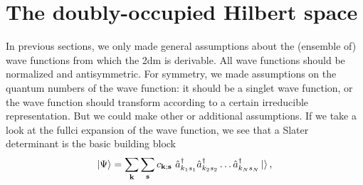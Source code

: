 \section{The doubly-occupied Hilbert space}\label{ch2-doci}
In previous sections, we only made general assumptions about the (ensemble of) wave functions from which the \gls{2dm} is derivable. All wave functions should be normalized and antisymmetric. For symmetry, we made assumptions on the quantum numbers of the wave function: it should be a singlet wave function, or the wave function should transform according to a certain irreducible representation.
But we could make other or additional assumptions. If we take a look at the \acrfull{fullci} expansion of the wave function, we see that a Slater determinant is the basic building block
\begin{equation}
    \ket{\Psi} = \sum_\mathbf{k} \sum_\mathbf{s} c_{\mathbf{k};\mathbf{s}} ~ \hat{a}_{k_1 s_1}^{\dagger}\hat{a}_{k_2s_2}^{\dagger}\ldots\hat{a}_{k_Ns_N}^{\dagger}\ket{},
        \label{2-eq106}
\end{equation}

